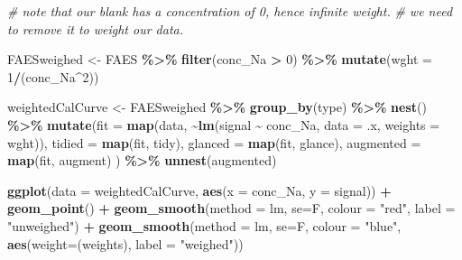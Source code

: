 \documentclass[
]{book}
\newenvironment{Shaded}{\begin{snugshade}}{\end{snugshade}}
\newcommand{\AttributeTok}[1]{\textcolor[rgb]{0.13,0.29,0.53}{#1}}
\newcommand{\CommentTok}[1]{\textcolor[rgb]{0.56,0.35,0.01}{\textit{#1}}}
\newcommand{\DecValTok}[1]{\textcolor[rgb]{0.00,0.00,0.81}{#1}}
\newcommand{\FunctionTok}[1]{\textcolor[rgb]{0.13,0.29,0.53}{\textbf{#1}}}
\newcommand{\NormalTok}[1]{#1}
\newcommand{\OtherTok}[1]{\textcolor[rgb]{0.56,0.35,0.01}{#1}}
\newcommand{\SpecialCharTok}[1]{\textcolor[rgb]{0.81,0.36,0.00}{\textbf{#1}}}
\newcommand{\StringTok}[1]{\textcolor[rgb]{0.31,0.60,0.02}{#1}}
\begin{document}
\begin{Shaded}
\begin{Highlighting}[]
\CommentTok{\# note that our blank has a concentration of 0, hence infinite weight. }
\CommentTok{\# we need to remove it to weight our data. }

\NormalTok{FAESweighed }\OtherTok{\textless{}{-}}\NormalTok{ FAES }\SpecialCharTok{\%\textgreater{}\%} 
  \FunctionTok{filter}\NormalTok{(conc\_Na }\SpecialCharTok{\textgreater{}} \DecValTok{0}\NormalTok{) }\SpecialCharTok{\%\textgreater{}\%}
  \FunctionTok{mutate}\NormalTok{(}\AttributeTok{wght =} \DecValTok{1}\SpecialCharTok{/}\NormalTok{(conc\_Na}\SpecialCharTok{\^{}}\DecValTok{2}\NormalTok{))}

\NormalTok{weightedCalCurve }\OtherTok{\textless{}{-}}\NormalTok{ FAESweighed }\SpecialCharTok{\%\textgreater{}\%}
  \FunctionTok{group\_by}\NormalTok{(type) }\SpecialCharTok{\%\textgreater{}\%}
  \FunctionTok{nest}\NormalTok{() }\SpecialCharTok{\%\textgreater{}\%}
  \FunctionTok{mutate}\NormalTok{(}\AttributeTok{fit =} \FunctionTok{map}\NormalTok{(data, }\SpecialCharTok{\textasciitilde{}}\FunctionTok{lm}\NormalTok{(signal }\SpecialCharTok{\textasciitilde{}}\NormalTok{ conc\_Na, }\AttributeTok{data =}\NormalTok{ .x, }\AttributeTok{weights =}\NormalTok{ wght)),}
         \AttributeTok{tidied =} \FunctionTok{map}\NormalTok{(fit, tidy),}
         \AttributeTok{glanced =} \FunctionTok{map}\NormalTok{(fit, glance),}
         \AttributeTok{augmented =} \FunctionTok{map}\NormalTok{(fit, augment)}
\NormalTok{         ) }\SpecialCharTok{\%\textgreater{}\%}
  \FunctionTok{unnest}\NormalTok{(augmented)}

\FunctionTok{ggplot}\NormalTok{(}\AttributeTok{data =}\NormalTok{ weightedCalCurve, }
       \FunctionTok{aes}\NormalTok{(}\AttributeTok{x =}\NormalTok{ conc\_Na, }\AttributeTok{y =}\NormalTok{ signal)) }\SpecialCharTok{+}
  \FunctionTok{geom\_point}\NormalTok{() }\SpecialCharTok{+}
  \FunctionTok{geom\_smooth}\NormalTok{(}\AttributeTok{method =} \StringTok{\textquotesingle{}lm\textquotesingle{}}\NormalTok{, }\AttributeTok{se=}\NormalTok{F, }\AttributeTok{colour =} \StringTok{"red"}\NormalTok{, }\AttributeTok{label =} \StringTok{"unweighed"}\NormalTok{) }\SpecialCharTok{+}
  \FunctionTok{geom\_smooth}\NormalTok{(}\AttributeTok{method =} \StringTok{\textquotesingle{}lm\textquotesingle{}}\NormalTok{, }\AttributeTok{se=}\NormalTok{F, }\AttributeTok{colour =} \StringTok{"blue"}\NormalTok{, }
              \FunctionTok{aes}\NormalTok{(}\AttributeTok{weight=}\StringTok{\textasciigrave{}}\AttributeTok{(weights)}\StringTok{\textasciigrave{}}\NormalTok{, }\AttributeTok{label =} \StringTok{"weighed"}\NormalTok{)) }
\end{Highlighting}
\end{Shaded}
\end{document}
